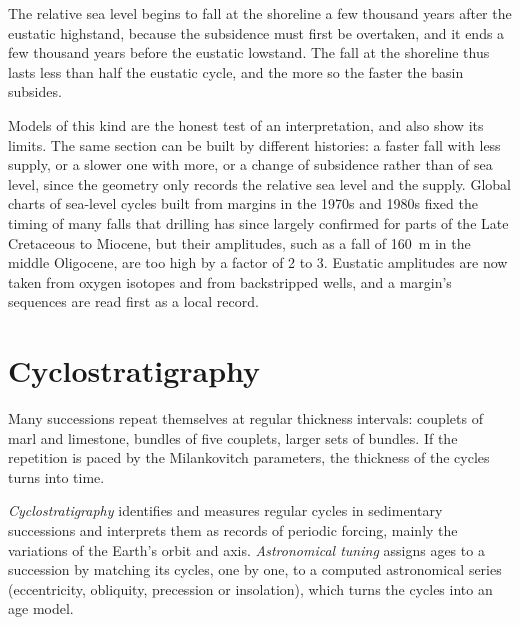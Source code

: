 \begin{omfigure}
\par{}\label{fig:b3:sequence-stratigraphy:section}
\end{omfigure}


The relative sea level begins to fall at the shoreline a few thousand years
after the eustatic highstand, because the subsidence must first be overtaken,
and it ends a few thousand years before the eustatic lowstand. The fall at
the shoreline thus lasts less than half the eustatic cycle, and the more so
the faster the basin subsides.

Models of this kind are the honest test of an interpretation, and also show
its limits. The same section can be built by different histories: a faster
fall with less supply, or a slower one with more, or a change of subsidence
rather than of sea level, since the geometry only records the relative sea
level and the supply. Global charts of sea-level cycles built from margins in
the 1970s and 1980s fixed the timing of many falls that drilling has since
largely confirmed for parts of the Late Cretaceous to Miocene, but their
amplitudes, such as a fall of \qty{160}{m} in the middle Oligocene, are too
high by a factor of 2 to 3. Eustatic amplitudes are now taken from
oxygen isotopes and from backstripped wells, and a margin's sequences are
read first as a local record.

\section{Cyclostratigraphy}\label{sec:b3:sequence-stratigraphy:cyclo}

Many successions repeat themselves at regular thickness intervals: couplets
of marl and limestone, bundles of five couplets, larger sets of bundles. If
the repetition is paced by the Milankovitch parameters, the thickness of the
cycles turns into time.

\begin{definition}\label{def:b3:sequence-stratigraphy:cyclo}
\emph{Cyclostratigraphy} identifies and measures
regular cycles in sedimentary successions and interprets them as records of
periodic forcing, mainly the variations of the Earth's orbit and axis.
\emph{Astronomical tuning} assigns ages to a
succession by matching its cycles, one by one, to a computed astronomical
series (eccentricity, obliquity, precession or insolation), which turns the
cycles into an age model.
\end{definition}

